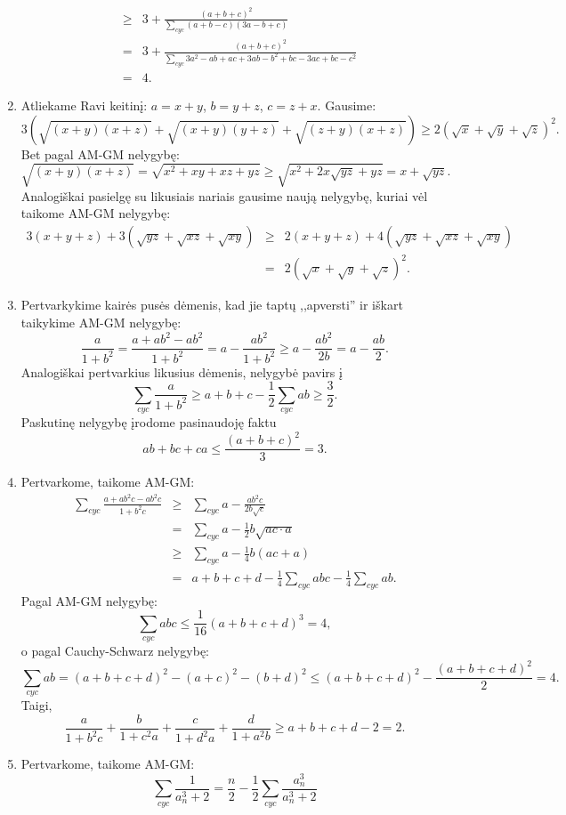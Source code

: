 \begin{enumerate}
\begin{eqnarray*}
    &\geq&3+\frac{(a+b+c)^2}{\sum\limits_{cyc}{(a+b-c)(3a-b+c)}}\\
    &=&3+\frac{(a+b+c)^2}{\sum\limits_{cyc}{3a^2-ab+ac+3ab-b^2+bc-3ac+bc-c^2}}\\
    &=&4.\end{eqnarray*}
\item
    Atliekame Ravi keitinį: $a=x+y$, $b=y+z$, $c=z+x$. Gausime:
    $$3\left(\sqrt{(x+y)(x+z)}+\sqrt{(x+y)(y+z)}+\sqrt{(z+y)(x+z)}\right)\geq2\left(\sqrt{x}+\sqrt{y}+\sqrt{z}\right)^2.$$
    Bet pagal AM-GM nelygybę:
    $$\sqrt{(x+y)(x+z)}=\sqrt{x^2+xy+xz+yz}\geq\sqrt{x^2+2x\sqrt{yz}+yz}=x+\sqrt{yz}.$$
    Analogiškai pasielgę su likusiais nariais gausime naują nelygybę,
    kuriai vėl taikome AM-GM nelygybę:
    \begin{eqnarray*}3(x+y+z)+3(\sqrt{yz}+\sqrt{xz}+\sqrt{xy})&\geq&2(x+y+z)+4(\sqrt{yz}+\sqrt{xz}+\sqrt{xy})\\
    &=&2\left(\sqrt{x}+\sqrt{y}+\sqrt{z}\right)^2.\end{eqnarray*}
\item
    Pertvarkykime kairės pusės dėmenis, kad jie taptų ,,apversti'' ir
    iškart taikykime AM-GM nelygybę:
    $$\frac{a}{1+b^2}=\frac{a+ab^2-ab^2}{1+b^2}=a-\frac{ab^2}{1+b^2}\geq
    a-\frac{ab^2}{2b}=a-\frac{ab}{2}.$$ Analogiškai pertvarkius likusius
    dėmenis, nelygybė pavirs į $$\sum_{cyc}{\frac{a}{1+b^2}}\geq
    a+b+c-\frac{1}{2}\sum_{cyc}{ab}\geq\frac{3}{2}.$$ Paskutinę nelygybę
    įrodome pasinaudoję faktu $$ab+bc+ca\leq\frac{(a+b+c)^2}{3}=3.$$
\item
    Pertvarkome, taikome AM-GM: \begin{eqnarray*}
    \sum_{cyc}{\frac{a+ab^2c-ab^2c}{1+b^2c}}&\geq&\sum_{cyc}{a-\frac{ab^2c}{2b\sqrt{c}}}\\
    &=&\sum_{cyc}{a-\frac{1}{2}b\sqrt{ac\cdot a}}\\
    &\geq&\sum_{cyc}{a-\frac{1}{4}b(ac+a)}\\&=&a+b+c+d-\frac{1}{4}\sum_{cyc}{abc}-\frac{1}{4}\sum_{cyc}{ab}.\end{eqnarray*}
    Pagal AM-GM nelygybę: $$\sum_{cyc}{abc}\leq\frac{1}{16}(a+b+c+d)^3=4,$$ o pagal
    Cauchy-Schwarz nelygybę:
    $$\sum_{cyc}{ab}=(a+b+c+d)^2-(a+c)^2-(b+d)^2\leq(a+b+c+d)^2-\frac{(a+b+c+d)^2}{2}=4.$$
    Taigi,
    $$\frac{a}{1+b^2c}+\frac{b}{1+c^2a}+\frac{c}{1+d^2a}+\frac{d}{1+a^2b}\geq
    a+b+c+d-2=2.$$
\item
    Pertvarkome, taikome AM-GM:
    $$\sum_{cyc}{\frac{1}{a_n^3+2}}=\frac{n}{2}-\frac{1}{2}\sum_{cyc}{\frac{a_n^3}{a_n^3+2}}
$$
\end{enumerate}
